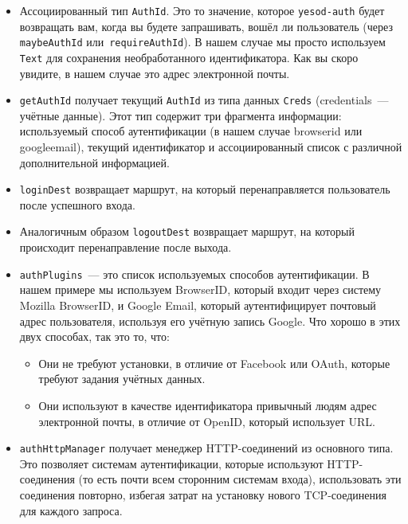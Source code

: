 \begin{itemize}
    \item Ассоциированный тип \lstinline'AuthId'. Это то значение, которое \lstinline'yesod-auth' будет возвращать вам, когда вы будете запрашивать, вошёл ли пользователь (через \lstinline'maybeAuthId' или~\lstinline'requireAuthId'). В нашем случае мы просто используем \lstinline'Text' для сохранения необработанного идентификатора. Как вы скоро увидите, в нашем случае это адрес электронной почты. 

    \item \lstinline'getAuthId' получает текущий \lstinline'AuthId' из типа данных \lstinline'Creds' (credentials~--- учётные данные). Этот тип содержит три фрагмента информации: используемый способ аутентификации (в нашем случае browserid или googleemail), текущий идентификатор и ассоциированный список с различной дополнительной информацией.

    \item \lstinline'loginDest' возвращает маршрут, на который перенаправляется пользователь после успешного входа.

    \item Аналогичным образом \lstinline'logoutDest' возвращает маршрут, на который происходит перенаправление после выхода. 

    \item \lstinline'authPlugins'~--- это список используемых способов аутентификации. В нашем примере мы используем BrowserID, который входит через систему Mozilla BrowserID, и Google Email, который аутентифицирует почтовый адрес пользователя, используя его учётную запись Google. Что хорошо в этих двух способах, так это то, что:
    
    \begin{itemize}
        \item Они не требуют установки, в отличие от Facebook или OAuth, которые требуют задания учётных данных.
        
        \item Они используют в качестве идентификатора привычный людям адрес электронной почты, в отличие от OpenID, который использует URL. 
    \end{itemize}
    
    \item \lstinline'authHttpManager' получает менеджер HTTP-соединений из основного типа. Это позволяет системам аутентификации, которые используют HTTP-соединения (то есть почти всем сторонним системам входа), использовать эти соединения повторно, избегая затрат на установку нового TCP-соединения для каждого запроса.
\end{itemize}

